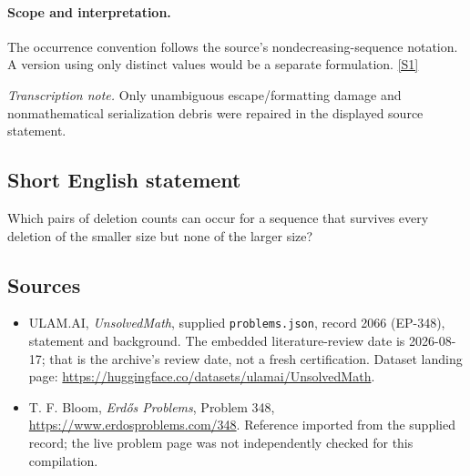 \documentclass[11pt,a4paper]{article}
\newcommand{\sref}[2]{\hyperlink{source:#1:#2}{[S#2]}}
\begin{document}
\paragraph{Scope and interpretation.}

The occurrence convention follows the source’s nondecreasing-sequence notation. A version using only distinct values would be a separate formulation. \sref{2066}{1}

{\small\emph{Transcription note.} Only unambiguous escape/formatting damage and nonmathematical serialization debris were repaired in the displayed source statement.}

\subsection{Short English statement}

Which pairs of deletion counts can occur for a sequence that survives every deletion of the smaller size but none of the larger size?

\subsection{Sources}

{\small

\begin{itemize}

\item[\hypertarget{source:2066:1}{S1}] ULAM.AI, \emph{UnsolvedMath}, supplied \texttt{problems.json}, record 2066 (EP-348), statement and background. The embedded literature-review date is 2026-08-17; that is the archive’s review date, not a fresh certification. Dataset landing page: \url{https://huggingface.co/datasets/ulamai/UnsolvedMath}.

\item[\hypertarget{source:2066:2}{S2}] T. F. Bloom, \emph{Erdős Problems}, Problem 348, \url{https://www.erdosproblems.com/348}. Reference imported from the supplied record; the live problem page was not independently checked for this compilation.

\end{itemize}

}

\label{end:2066}
\end{document}
